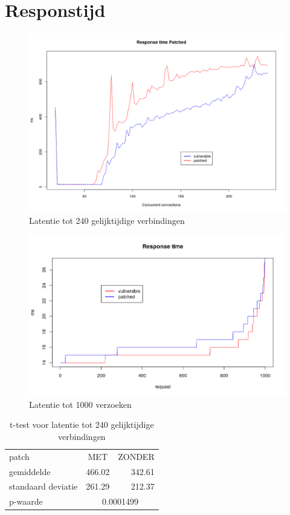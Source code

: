 \section{Responstijd}

\begin{figure}
	\includegraphics[width=1.0\linewidth]{img/ms_conc.png}
	\caption{Latentie tot 240 gelijktijdige verbindingen}
	\label{fig:ms_conc}
\end{figure}

\begin{figure}
	\includegraphics[width=1.0\linewidth]{img/ms_patched_vuln.png}
	\caption{Latentie tot 1000 verzoeken}
	\label{fig:ms_patched_vuln}
\end{figure}

\begin{table}[]
	\centering
	\caption{t-test voor latentie tot 240 gelijktijdige verbindingen}
	\label{t_ms_conc}
	\begin{tabular}{l|cr}
		\hline
		patch              & MET                        & \multicolumn{1}{c}{ZONDER} \\
		gemiddelde         & \multicolumn{1}{r}{466.02} & 342.61                     \\
		standaard deviatie & \multicolumn{1}{r}{261.29} & 212.37                     \\ \hline
		p-waarde           & \multicolumn{2}{c|}{0.0001499}                         
	\end{tabular}
\end{table}

